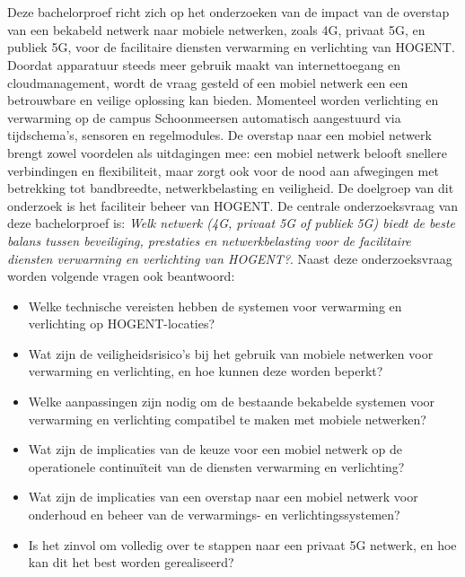 
\chapter{}%
\label{ch:inleiding}

Deze bachelorproef richt zich op het onderzoeken van de impact van de overstap van een bekabeld netwerk naar mobiele netwerken, zoals 4G, privaat 5G, en publiek 5G, voor de facilitaire diensten verwarming en verlichting van HOGENT. Doordat apparatuur steeds meer gebruik maakt van internettoegang en cloudmanagement, wordt de vraag gesteld of een mobiel netwerk een een betrouwbare en veilige oplossing kan bieden. Momenteel worden verlichting en verwarming op de campus Schoonmeersen automatisch aangestuurd via tijdschema's, sensoren en regelmodules. De overstap naar een mobiel netwerk brengt zowel voordelen als uitdagingen mee: een mobiel netwerk belooft snellere verbindingen en flexibiliteit, maar zorgt ook voor de nood aan afwegingen met betrekking tot bandbreedte, netwerkbelasting en veiligheid. De doelgroep van dit onderzoek is het faciliteir beheer van HOGENT. De centrale onderzoeksvraag van deze bachelorproef is: \textit{Welk netwerk (4G, privaat 5G of publiek 5G) biedt de beste balans tussen beveiliging, prestaties en netwerkbelasting voor de facilitaire diensten verwarming en verlichting van HOGENT?}. Naast deze onderzoeksvraag worden volgende vragen ook beantwoord: 
\begin{itemize}
    \item Welke technische vereisten hebben de systemen voor verwarming en verlichting op HOGENT-locaties?
    \item Wat zijn de veiligheidsrisico’s bij het gebruik van mobiele netwerken voor verwarming en verlichting, en hoe kunnen deze worden beperkt?
    \item Welke aanpassingen zijn nodig om de bestaande bekabelde systemen voor verwarming en verlichting compatibel te maken met mobiele netwerken?
    \item Wat zijn de implicaties van de keuze voor een mobiel netwerk op de operationele continuïteit van de diensten verwarming en verlichting?
    \item Wat zijn de implicaties van een overstap naar een mobiel netwerk voor onderhoud en beheer van de verwarmings- en verlichtingssystemen?
    \item Is het zinvol om volledig over te stappen naar een privaat 5G netwerk, en hoe kan dit het best worden gerealiseerd?
\end{itemize}
